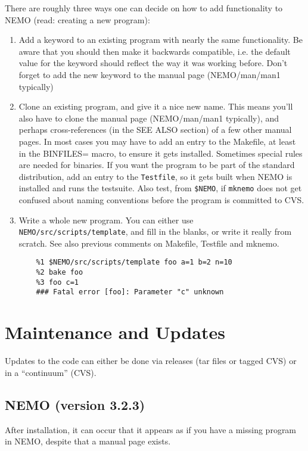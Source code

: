 \begin{itemize}
\begin{itemize}
There are roughly three ways one can decide on how to add functionality
to NEMO (read: creating a new program):

\begin{enumerate}
\item  Add a keyword to an existing program with nearly the same functionality.
Be aware that you should
then make it backwards compatible, i.e. the default value for the keyword
should reflect the way it was working before. Don't forget to add
the new keyword to the manual page (NEMO/man/man1 typically)

\item
Clone an existing program, and give it a nice new name. This means you'll also 
have to clone the manual page (NEMO/man/man1 typically), 
and perhaps cross-references (in the SEE ALSO section) of a few other manual
pages. In most cases you may have to add an entry to the Makefile,
at least in the BINFILES= macro, to ensure it gets installed.
Sometimes special rules are needed for binaries.
If you want the program to be part of the standard distribution, add
an entry to the {\tt Testfile}, so it gets built when NEMO is installed
and runs the testsuite.
Also test, from {\tt \$NEMO}, if {\tt mknemo}
does not get confused about naming conventions before the program
is committed to CVS.

\item
Write a whole new program. You can either use {\tt NEMO/src/scripts/template},
and fill in the blanks, or write it really from scratch. See also 
previous comments on Makefile, Testfile and mknemo.

\footnotesize\begin{verbatim}
    %1 $NEMO/src/scripts/template foo a=1 b=2 n=10
    %2 bake foo
    %3 foo c=1 
    ### Fatal error [foo]: Parameter "c" unknown
\end{verbatim}\normalsize

\end{enumerate}

\chapter                {Maintenance and Updates}

Updates to the code can either be done via releases (tar files or
tagged CVS) or in a ``continuum'' (CVS).

\section{NEMO (version 3.2.3)}
After installation, it can occur that it appears 
as if you have a missing program in NEMO, despite that a 
manual page exists.


\end{itemize}
\end{itemize}
